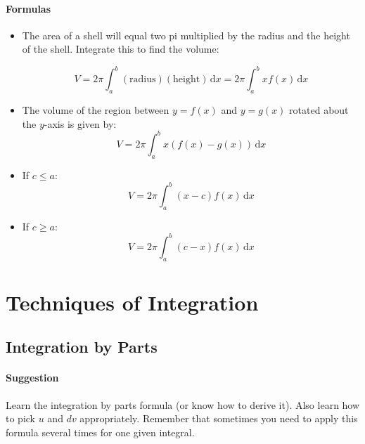 \documentclass[11pt]{article}
\begin{document}
		\paragraph{Formulas} 
			\begin{itemize}
					
				\item The area of a shell will equal two pi multiplied by the radius and the height of the shell. Integrate this to find the volume:
				
					\begin{equation*}
						V = 2\pi\int_a^b \! (\mathrm{radius})(\mathrm{height}) \, \mathrm{d}x = 
							2\pi\int_a^b \! xf(x) \, \mathrm{d}x
					\end{equation*}
				
				\item The volume of the region between $y = f(x)$ and $y = g(x)$ rotated about the $y$-axis is given by:
					\begin{equation*}
						V = 2\pi\int_a^b \! x(f(x) - g(x)) \, \mathrm{d}x
					\end{equation*}	
					
				\item If $c \le a$:
					\begin{equation*}
						V = 2\pi\int_a^b \! (x - c)f(x) \, \mathrm{d}x
					\end{equation*}		
					
				\item If $c \ge a$:
					\begin{equation*}
						V = 2\pi\int_a^b \! (c - x)f(x) \, \mathrm{d}x
					\end{equation*}	
							
			\end{itemize}
			
\pagebreak
\section{Techniques of Integration}
	\subsection{Integration by Parts}
		\paragraph{Suggestion} Learn the integration by parts formula (or know how to derive it). 
		Also learn how to pick $u$ and $dv$ appropriately. 
		Remember that sometimes you need to apply this formula several times for one given integral.
		
\end{document}
